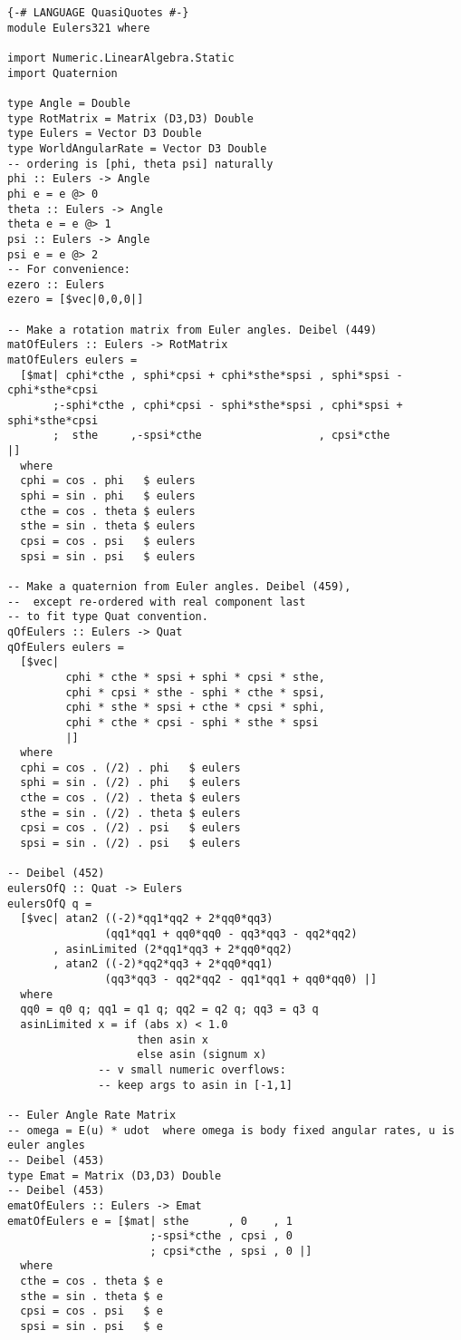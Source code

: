 \documentclass[12pt]{report}
\begin{document}
\begin{lstlisting}
{-# LANGUAGE QuasiQuotes #-}
module Eulers321 where

import Numeric.LinearAlgebra.Static
import Quaternion

type Angle = Double
type RotMatrix = Matrix (D3,D3) Double
type Eulers = Vector D3 Double
type WorldAngularRate = Vector D3 Double
-- ordering is [phi, theta psi] naturally
phi :: Eulers -> Angle
phi e = e @> 0
theta :: Eulers -> Angle
theta e = e @> 1
psi :: Eulers -> Angle
psi e = e @> 2
-- For convenience:
ezero :: Eulers
ezero = [$vec|0,0,0|]

-- Make a rotation matrix from Euler angles. Deibel (449)
matOfEulers :: Eulers -> RotMatrix
matOfEulers eulers = 
  [$mat| cphi*cthe , sphi*cpsi + cphi*sthe*spsi , sphi*spsi - cphi*sthe*cpsi 
       ;-sphi*cthe , cphi*cpsi - sphi*sthe*spsi , cphi*spsi + sphi*sthe*cpsi
       ;  sthe     ,-spsi*cthe                  , cpsi*cthe                  |]
  where
  cphi = cos . phi   $ eulers
  sphi = sin . phi   $ eulers
  cthe = cos . theta $ eulers
  sthe = sin . theta $ eulers
  cpsi = cos . psi   $ eulers
  spsi = sin . psi   $ eulers

-- Make a quaternion from Euler angles. Deibel (459),
--  except re-ordered with real component last
-- to fit type Quat convention.
qOfEulers :: Eulers -> Quat
qOfEulers eulers =
  [$vec| 
         cphi * cthe * spsi + sphi * cpsi * sthe,
         cphi * cpsi * sthe - sphi * cthe * spsi,
         cphi * sthe * spsi + cthe * cpsi * sphi,
         cphi * cthe * cpsi - sphi * sthe * spsi
         |]
  where
  cphi = cos . (/2) . phi   $ eulers
  sphi = sin . (/2) . phi   $ eulers
  cthe = cos . (/2) . theta $ eulers
  sthe = sin . (/2) . theta $ eulers
  cpsi = cos . (/2) . psi   $ eulers
  spsi = sin . (/2) . psi   $ eulers

-- Deibel (452)
eulersOfQ :: Quat -> Eulers
eulersOfQ q =
  [$vec| atan2 ((-2)*qq1*qq2 + 2*qq0*qq3) 
               (qq1*qq1 + qq0*qq0 - qq3*qq3 - qq2*qq2)
       , asinLimited (2*qq1*qq3 + 2*qq0*qq2)
       , atan2 ((-2)*qq2*qq3 + 2*qq0*qq1) 
               (qq3*qq3 - qq2*qq2 - qq1*qq1 + qq0*qq0) |]
  where 
  qq0 = q0 q; qq1 = q1 q; qq2 = q2 q; qq3 = q3 q
  asinLimited x = if (abs x) < 1.0 
                    then asin x 
                    else asin (signum x) 
              -- v small numeric overflows: 
              -- keep args to asin in [-1,1]

-- Euler Angle Rate Matrix
-- omega = E(u) * udot  where omega is body fixed angular rates, u is euler angles
-- Deibel (453)
type Emat = Matrix (D3,D3) Double
-- Deibel (453)
ematOfEulers :: Eulers -> Emat
ematOfEulers e = [$mat| sthe      , 0    , 1
                      ;-spsi*cthe , cpsi , 0
                      ; cpsi*cthe , spsi , 0 |]
  where
  cthe = cos . theta $ e
  sthe = sin . theta $ e
  cpsi = cos . psi   $ e
  spsi = sin . psi   $ e


\end{lstlisting}
\end{document}
